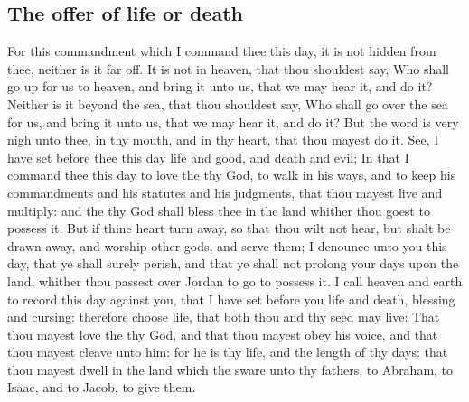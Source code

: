 \begin{biblechapter}
\section*{The offer of life or death}
\verse For this commandment which I command thee this day, it is not hidden from thee, neither is it far off.
\verse It is not in heaven, that thou shouldest say, Who shall go up for us to heaven, and bring it unto us, that we may hear it, and do it?
\verse Neither is it beyond the sea, that thou shouldest say, Who shall go over the sea for us, and bring it unto us, that we may hear it, and do it?
\verse But the word is very nigh unto thee, in thy mouth, and in thy heart, that thou mayest do it.
\verse See, I have set before thee this day life and good, and death and evil;
\verse In that I command thee this day to love the \LORD thy God, to walk in his ways, and to keep his commandments and his statutes and his judgments, that thou mayest live and multiply: and the \LORD thy God shall bless thee in the land whither thou goest to possess it.
\verse But if thine heart turn away, so that thou wilt not hear, but shalt be drawn away, and worship other gods, and serve them;
\verse I denounce unto you this day, that ye shall surely perish, and that ye shall not prolong your days upon the land, whither thou passest over Jordan to go to possess it.
\verse I call heaven and earth to record this day against you, that I have set before you life and death, blessing and cursing: therefore choose life, that both thou and thy seed may live:
\verse That thou mayest love the \LORD thy God, and that thou mayest obey his voice, and that thou mayest cleave unto him: for he is thy life, and the length of thy days: that thou mayest dwell in the land which the \LORD sware unto thy fathers, to Abraham, to Isaac, and to Jacob, to give them.
\end{biblechapter}

